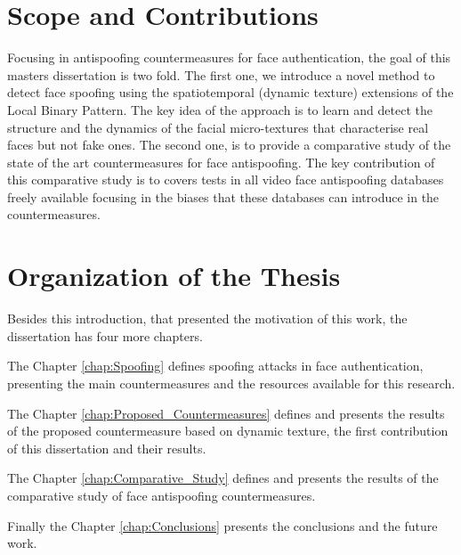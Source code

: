\section{Scope and Contributions}
\label{sec:scope}

Focusing in antispoofing countermeasures for face authentication, the goal of this masters dissertation is two fold. The first one, we introduce a novel method to detect face spoofing using the spatiotemporal (dynamic texture) extensions of the Local Binary Pattern. The key idea of the approach is to learn and detect the structure and the dynamics of the facial micro-textures that characterise real faces but not fake ones. The second one, is to provide a comparative study of the state of the art countermeasures for face antispoofing. The key contribution of this comparative study is to covers tests in all video face antispoofing databases freely available focusing in the biases that these databases can introduce in the countermeasures.

\section{Organization of the Thesis}
\label{sec:scope}

Besides this introduction, that presented the motivation of this work, the dissertation has four more chapters. 

The Chapter \ref{chap:Spoofing} defines spoofing attacks in face authentication, presenting the main countermeasures and the resources available for this research.

The Chapter \ref{chap:Proposed_Countermeasures} defines and presents the results of the proposed countermeasure based on dynamic texture, the first contribution of this dissertation and their results.

The Chapter \ref{chap:Comparative_Study} defines and presents the results of the comparative study of face antispoofing countermeasures.

Finally the Chapter \ref{chap:Conclusions} presents the conclusions and the future work.

